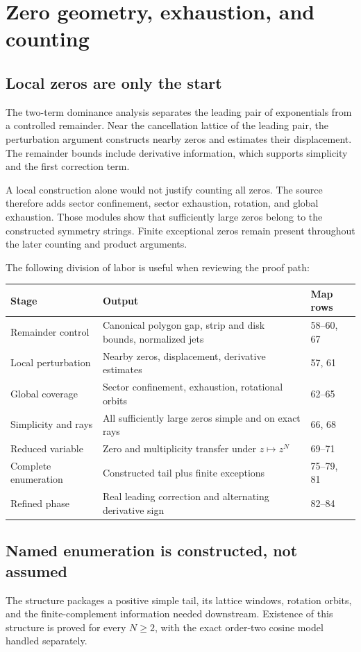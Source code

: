 \section{Zero geometry, exhaustion, and counting}
\subsection{Local zeros are only the start}
The two-term dominance analysis separates the leading pair of exponentials from a controlled remainder. Near the cancellation lattice of the leading pair, the perturbation argument constructs nearby zeros and estimates their displacement. The remainder bounds include derivative information, which supports simplicity and the first correction term.

A local construction alone would not justify counting all zeros. The source therefore adds sector confinement, sector exhaustion, rotation, and global exhaustion. Those modules show that sufficiently large zeros belong to the constructed symmetry strings. Finite exceptional zeros remain present throughout the later counting and product arguments.

The following division of labor is useful when reviewing the proof path:
\begin{longtable}{p{}p{}p{}}
\toprule Stage & Output & Map rows \\ \midrule\endhead
Remainder control & Canonical polygon gap, strip and disk bounds, normalized jets & 58--60, 67 \\
Local perturbation & Nearby zeros, displacement, derivative estimates & 57, 61 \\
Global coverage & Sector confinement, exhaustion, rotational orbits & 62--65 \\
Simplicity and rays & All sufficiently large zeros simple and on exact rays & 66, 68 \\
Reduced variable & Zero and multiplicity transfer under $z\mapsto z^N$ & 69--71 \\
Complete enumeration & Constructed tail plus finite exceptions & 75--79, 81 \\
Refined phase & Real leading correction and alternating derivative sign & 82--84 \\
\bottomrule
\end{longtable}

\subsection{Named enumeration is constructed, not assumed}
The  structure packages a positive simple tail, its lattice windows, rotation orbits, and the finite-complement information needed downstream. Existence of this structure is proved for every $N\geq2$, with the exact order-two cosine model handled separately.

